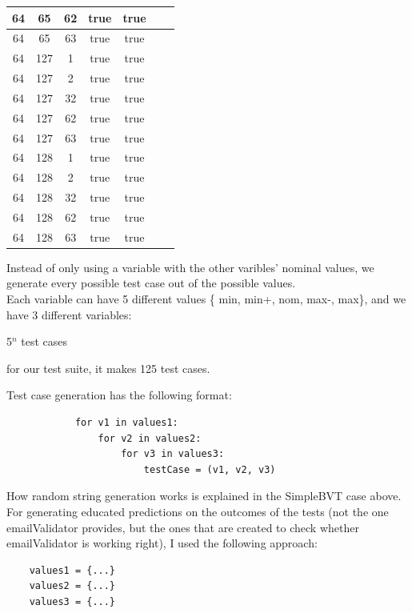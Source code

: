 \documentclass[a4paper,9pt,oneside]{scrreprt}
\begin{document}
\begin{enumerate}[a)]
\begin{paracol}{2}
\begin{table}[!htb]
\begin{minipage}{.5\linewidth}
{\begin{tabular}{|c|c|c|c|c|c|c|}
							\hline
							64&65&62&true&true\\
							\hline
							64&65&63&true&true\\
							\hline
							64&127&1&true&true\\
							\hline
							64&127&2&true&true\\
							\hline
							64&127&32&true&true\\
							\hline
							64&127&62&true&true\\
							\hline
							64&127&63&true&true\\
							\hline
							64&128&1&true&true\\
							\hline
							64&128&2&true&true\\
							\hline
							64&128&32&true&true\\
							\hline
							64&128&62&true&true\\
							\hline
							64&128&63&true&true\\
							\hline
						\end{tabular}
						\bigskip
					}
				\end{minipage} 
			\end{table}
				
			\switchcolumn
			
			Instead of only using a variable with the other varibles' nominal values, we generate every possible test case out of the possible values.\\
			
			Each variable can have 5 different values \{ min, min+, nom, max-, max\}, and we have 3 different variables:
			\bigskip
			
			Test case generation has the following format:
		\begin{lstlisting}
			for v1 in values1:
				for v2 in values2:
					for v3 in values3:
						testCase = (v1, v2, v3)
		\end{lstlisting}
		\bigskip
		
		How random string generation works is explained in the SimpleBVT case above.\\
		
		For generating educated predictions on the outcomes of the tests (not the one emailValidator provides, but the ones that are created to check whether emailValidator is working right), I used the following approach:
			\begin{lstlisting}
	values1 = {...}
	values2 = {...}
	values3 = {...}
	

\end{lstlisting}
\end{paracol}
\end{enumerate}
\end{document}
